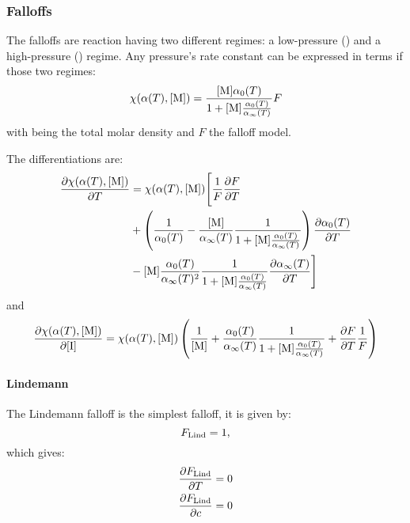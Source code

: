 \subsubsection{Falloffs}
\label{subsub:falloff}
The falloffs are reaction having two different regimes: a low-pressure (\kinModZ) and
a high-pressure (\kinModI) regime. Any pressure's rate constant can be expressed in
terms if those two regimes:
\begin{equation}
\chemProc = \frac{\conc[M]\kinModZ}{1 + \conc[M]\frac{\kinModZ}{\kinModI}} F
\label{falloff:k}
\end{equation}
with \conc[M] being the total molar density and $F$ the falloff model.

The differentiations are:
\begin{equation}
\begin{split}
\doverdT{\chemProc} & = \chemProc 
                        \Bigg[\frac{1}{F}\doverdT{F} \\
                    &      + \left(\frac{1}{\kinModZ} - \frac{\conc[M]}{\kinModI}\frac{1}{1 + \conc[M]\frac{\kinModZ}{\kinModI}}\right)\doverdT{\kinModZ} \\
                    &      - \conc[M]\frac{\kinModZ}{\kinModI^2}\frac{1}{1 + \conc[M]\frac{\kinModZ}{\kinModI}}\doverdT{\kinModI}
                        \Bigg]
\end{split}
\label{Falloff:doverdT}
\end{equation}
and
\begin{equation}
\doverdc[I]{\chemProc} = \chemProc
                          \left(\frac{1}{\conc[M]} 
                               + \frac{\kinModZ}{\kinModI}\frac{1}{1 + \conc[M]\frac{\kinModZ}{\kinModI}} 
                               + \doverdT{F}\frac{1}{F}
                          \right)
\label{Falloff:doverdc}
\end{equation}
\paragraph{Lindemann}
The Lindemann falloff is the simplest falloff, it is given by:
\begin{equation}
F_\text{Lind} = 1,
\label{Falloff:Lindeman}
\end{equation}
which gives:
\begin{equation}
\begin{split}
\doverdT{\FLind} & = 0 \\
\doverdc{\FLind} & = 0 \\
\end{split}
\label{Falloff:Lindemann:diff}
\end{equation}

